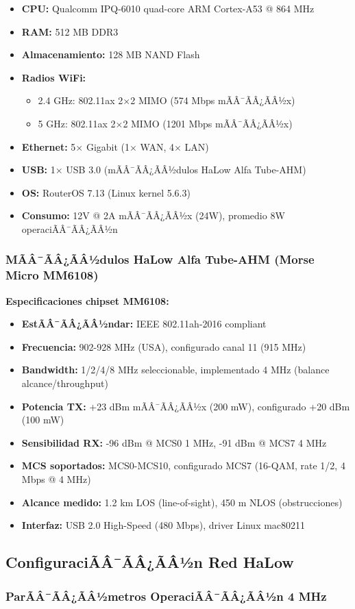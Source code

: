 \begin{itemize}\n    \item \textbf{CPU:} Qualcomm IPQ-6010 quad-core ARM Cortex-A53 @ 864 MHz\n    \item \textbf{RAM:} 512 MB DDR3\n    \item \textbf{Almacenamiento:} 128 MB NAND Flash\n    \item \textbf{Radios WiFi:} \n        \begin{itemize}\n        \item 2.4 GHz: 802.11ax 2$\times$2 MIMO (574 Mbps mÃÂ¯ÃÂ¿ÃÂ½x)\n        \item 5 GHz: 802.11ax 2$\times$2 MIMO (1201 Mbps mÃÂ¯ÃÂ¿ÃÂ½x)\n        \end{itemize}\n    \item \textbf{Ethernet:} 5$\times$ Gigabit (1$\times$ WAN, 4$\times$ LAN)\n    \item \textbf{USB:} 1$\times$ USB 3.0 (mÃÂ¯ÃÂ¿ÃÂ½dulos HaLow Alfa Tube-AHM)\n    \item \textbf{OS:} RouterOS 7.13 (Linux kernel 5.6.3)\n    \item \textbf{Consumo:} 12V @ 2A mÃÂ¯ÃÂ¿ÃÂ½x (24W), promedio 8W operaciÃÂ¯ÃÂ¿ÃÂ½n\n\end{itemize}\n\n\subsubsection{MÃÂ¯ÃÂ¿ÃÂ½dulos HaLow Alfa Tube-AHM (Morse Micro MM6108)}\n\n\textbf{Especificaciones chipset MM6108:}\n\begin{itemize}\n    \item \textbf{EstÃÂ¯ÃÂ¿ÃÂ½ndar:} IEEE 802.11ah-2016 compliant\n    \item \textbf{Frecuencia:} 902-928 MHz (USA), configurado canal 11 (915 MHz)\n    \item \textbf{Bandwidth:} 1/2/4/8 MHz seleccionable, implementado 4 MHz (balance alcance/throughput)\n    \item \textbf{Potencia TX:} +23 dBm mÃÂ¯ÃÂ¿ÃÂ½x (200 mW), configurado +20 dBm (100 mW)\n    \item \textbf{Sensibilidad RX:} -96 dBm @ MCS0 1 MHz, -91 dBm @ MCS7 4 MHz\n    \item \textbf{MCS soportados:} MCS0-MCS10, configurado MCS7 (16-QAM, rate 1/2, 4 Mbps @ 4 MHz)\n    \item \textbf{Alcance medido:} 1.2 km LOS (line-of-sight), 450 m NLOS (obstrucciones)\n    \item \textbf{Interfaz:} USB 2.0 High-Speed (480 Mbps), driver Linux mac80211\n\end{itemize}\n\n\subsection{ConfiguraciÃÂ¯ÃÂ¿ÃÂ½n Red HaLow}\n\label{sec:impl-config-halow}\n\n\subsubsection{ParÃÂ¯ÃÂ¿ÃÂ½metros OperaciÃÂ¯ÃÂ¿ÃÂ½n 4 MHz}

